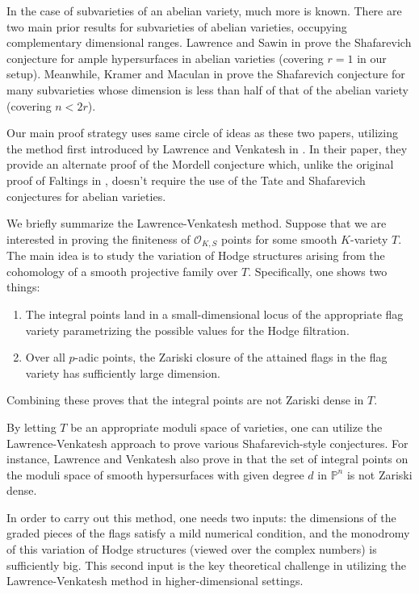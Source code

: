 \documentclass{article}
\theoremstyle{definition}
\theoremstyle{remark}
\begin{document}
\par In the case of subvarieties of an abelian variety, much more is known. There are two main prior results for subvarieties of abelian varieties, occupying complementary dimensional ranges. Lawrence and Sawin in \cite{ls25} prove the Shafarevich conjecture for ample hypersurfaces in abelian varieties (covering $r = 1$ in our setup). Meanwhile, Kramer and Maculan in \cite{km24} prove the Shafarevich conjecture for many subvarieties whose dimension is less than half of that of the abelian variety (covering $n < 2r$).
\par Our main proof strategy uses same circle of ideas as these two papers, utilizing the method first introduced by Lawrence and Venkatesh in \cite{lv18}. In their paper, they provide an alternate proof of the Mordell conjecture which, unlike the original proof of Faltings in \cite{faltings}, doesn't require the use of the Tate and Shafarevich conjectures for abelian varieties. 
\par We briefly summarize the Lawrence-Venkatesh method. Suppose that we are interested in proving the finiteness of $\mathcal{O}_{K, S}$ points for some smooth $K$-variety $T.$ The main idea is to study the variation of Hodge structures arising from the cohomology of a smooth projective family over $T.$ Specifically, one shows two things:
\begin{enumerate}
    \item The integral points land in a small-dimensional locus of the appropriate flag variety parametrizing the possible values for the Hodge filtration. 
    \item Over all $p$-adic points, the Zariski closure of the attained flags in the flag variety has sufficiently large dimension. 
\end{enumerate}
Combining these proves that the integral points are not Zariski dense in $T.$ 
\par By letting $T$ be an appropriate moduli space of varieties, one can utilize the Lawrence-Venkatesh approach to prove various Shafarevich-style conjectures. For instance, Lawrence and Venkatesh also prove in \cite{lv18} that the set of integral points on the moduli space of smooth hypersurfaces with given degree $d$ in $\mathbb{P}^n$ is not Zariski dense.
\par In order to carry out this method, one needs two inputs: the dimensions of the graded pieces of the flags satisfy a mild numerical condition, and the monodromy of this variation of Hodge structures (viewed over the complex numbers) is sufficiently big. This second input is the key theoretical challenge in utilizing the Lawrence-Venkatesh method in higher-dimensional settings.
\end{document}

